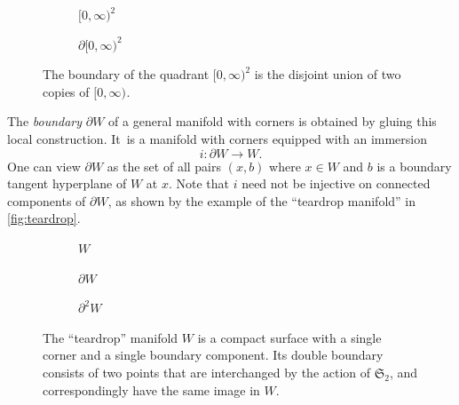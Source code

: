 \documentclass[JEP,XML,SOM,Unicode,NoFloatCountersInSection,published]{cedram}
\theoremstyle{definition}
\theoremstyle{remark}
\let\defn\emph
\newcommand{\halfspc}[1]{[0,\infty)^{#1}}
\newcommand{\symgp}[1]{\mathfrak{S}_{#1}}
\begin{document}
\begin{figure}
\centering
\begin{subfigure}[t]{0.3\textwidth}
\centering
{}
\caption{$\halfspc{2}$}
\end{subfigure}
\begin{subfigure}[t]{0.3\textwidth}
\centering
{}
\caption{$\partial \halfspc{2}$}
\end{subfigure}
\caption{The boundary of the quadrant $\halfspc{2}$ is the disjoint union of two copies of $\halfspc{}$.}
\label{fig:boundary-quadrant}
\end{figure}

The \defn{boundary} $\partial W$ of a general manifold with corners is obtained by gluing this local construction. It~is a manifold with corners equipped with an immersion
\[
i\colon \partial W\to W.
\]
One can view $\partial W$ as the set of all pairs $(x,b)$ where $x\in W$ and $b$ is a boundary tangent hyperplane of $ W$ at $x$. Note that $i$ need not be injective on connected components of $\partial W$, as shown by the example of the ``teardrop manifold'' in \autoref{fig:teardrop}.

\begin{figure}
\centering
\begin{subfigure}[t]{0.3\textwidth}
\centering
{}
\caption{$ W$}
\end{subfigure}
\begin{subfigure}[t]{0.3\textwidth}
\centering
{}
\caption{$\partial W$}
\end{subfigure}
\begin{subfigure}[t]{0.3\textwidth}
\centering
{}
\caption{$\partial^2 W$}
\end{subfigure}
\caption{The ``teardrop'' manifold $ W$ is a compact surface with a single corner and a single boundary component. Its double boundary consists of two points that are interchanged by the action of $\symgp{2}$, and correspondingly have the same image in $ W$.}
\label{fig:teardrop}
\end{figure}
\end{document}
